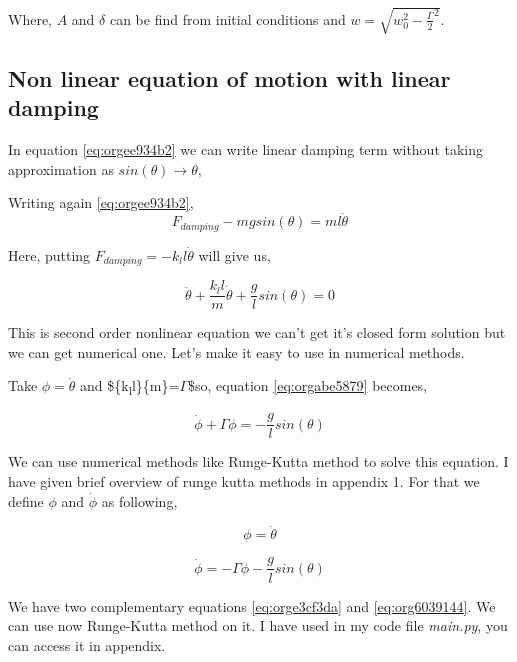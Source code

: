 \documentclass[11pt,a4paper]{article}
\begin{document}
Where, \(A\) and \(\delta\) can be find from initial conditions and \(w = \sqrt{w_{0}^{2}-\frac{\Gamma}{2}^{2}}\).

\subsection{Non linear equation of motion with linear damping}
\label{sec:org8675830}

In equation \ref{eq:orgee934b2} we can write linear damping term without taking approximation as \(sin(\theta) \to \theta\),

Writing again \ref{eq:orgee934b2}, 
\begin{equation*}
\label{eq:org67d53c2}
F_{damping}-mgsin(\theta)=ml\ddot{\theta}
\end{equation*}

Here, putting \(F_{damping}=-k_{l}l\dot{\theta}\) will give us,

\begin{equation}
\label{eq:orgabe5879}
\ddot{\theta}+\frac{k_{l}l}{m}\dot{\theta}+\frac{g}{l}sin(\theta)=0
\end{equation}

This is second order nonlinear equation we can't get it's closed form solution but we can get numerical one. Let's make it easy to use in numerical methods.

Take \(\phi = \dot{\theta}\) and \$\frac\{k\textsubscript{l}l\}\{m\}=\(\Gamma\)\$so, equation \ref{eq:orgabe5879} becomes,

\begin{equation}
\label{eq:org2e4247b}
\dot{\phi}+\Gamma\phi=-\frac{g}{l} sin(\theta)
\end{equation}

We can use numerical methods like Runge-Kutta method to solve this equation. I have given brief overview of runge kutta methods in appendix 1. For that we define \(\phi\) and \(\dot{\phi}\) as following,

\begin{equation}
\label{eq:orge3cf3da}
\phi=\dot{\theta}
\end{equation}

\begin{equation}
\label{eq:org6039144}
\dot{\phi}=-\Gamma\phi-\frac{g}{l} sin(\theta)
\end{equation}

We have two complementary equations \ref{eq:orge3cf3da} and \ref{eq:org6039144}. We can use now Runge-Kutta method on it. I have used in my code file \emph{main.py}, you can access it in appendix. 
\end{document}
